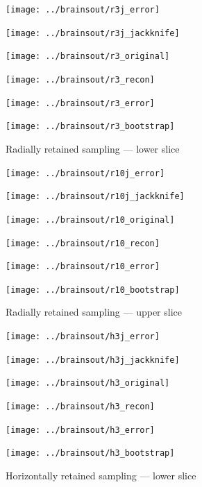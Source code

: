 \documentclass[article]{jdssv}
\begin{document}
\newlength{\vertsep}
\setlength{\vertsep}{.0in}
\newlength{\imsize}
\setlength{\imsize}{.34\textwidth}
\newlength{\imsizes}
\setlength{\imsizes}{.49\textwidth}


\begin{figure}
\begin{centering}

\parbox{\imsize}{\texttt{[image: ../brainsout/r3j\_error]}}
\parbox{\imsize}{\texttt{[image: ../brainsout/r3j\_jackknife]}}

\vspace{\vertsep}

\parbox{\imsize}{\texttt{[image: ../brainsout/r3\_original]}}
\parbox{\imsize}{\texttt{[image: ../brainsout/r3\_recon]}}

\vspace{\vertsep}

\parbox{\imsize}{\texttt{[image: ../brainsout/r3\_error]}}
\parbox{\imsize}{\texttt{[image: ../brainsout/r3\_bootstrap]}}

\end{centering}
\caption{Radially retained sampling --- lower slice}
\label{bigradial}
\end{figure}


\begin{figure}
\begin{centering}

\parbox{\imsize}{\texttt{[image: ../brainsout/r10j\_error]}}
\parbox{\imsize}{\texttt{[image: ../brainsout/r10j\_jackknife]}}

\vspace{\vertsep}

\parbox{\imsize}{\texttt{[image: ../brainsout/r10\_original]}}
\parbox{\imsize}{\texttt{[image: ../brainsout/r10\_recon]}}

\vspace{\vertsep}

\parbox{\imsize}{\texttt{[image: ../brainsout/r10\_error]}}
\parbox{\imsize}{\texttt{[image: ../brainsout/r10\_bootstrap]}}

\end{centering}
\caption{Radially retained sampling --- upper slice}
\label{afterbigradial}
\end{figure}


\begin{figure}
\begin{centering}

\parbox{\imsize}{\texttt{[image: ../brainsout/h3j\_error]}}
\parbox{\imsize}{\texttt{[image: ../brainsout/h3j\_jackknife]}}

\vspace{\vertsep}

\parbox{\imsize}{\texttt{[image: ../brainsout/h3\_original]}}
\parbox{\imsize}{\texttt{[image: ../brainsout/h3\_recon]}}

\vspace{\vertsep}

\parbox{\imsize}{\texttt{[image: ../brainsout/h3\_error]}}
\parbox{\imsize}{\texttt{[image: ../brainsout/h3\_bootstrap]}}

\end{centering}
\caption{Horizontally retained sampling --- lower slice}
\end{figure}
\end{document}
